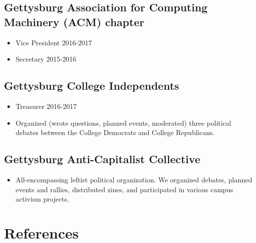 \documentclass[11pt]{article}
\begin{document}
\subsection*{Gettysburg Association for Computing Machinery (ACM) chapter}
\begin{itemize}[noitemsep]
	\item Vice President \hfill 2016-2017
	\item Secretary \hfill 2015-2016
\end{itemize}
 
\subsection*{Gettysburg College Independents} 
\begin{itemize}[noitemsep]
	\item Treasurer \hfill 2016-2017
    \item Organized (wrote questions, planned events, moderated) three political debates between the College Democrats and College Republicans. 
\end{itemize}

\subsection*{Gettysburg Anti-Capitalist Collective}
\begin{itemize}[noitemsep]
    \item All-encompassing leftist political organization. We organized debates, planned events and rallies, distributed zines, and participated in various campus activism projects.
\end{itemize}


\section*{References}
\end{document}
